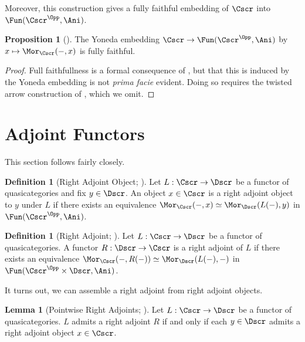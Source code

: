 \documentclass{amsart}
\theoremstyle{definition}
\newtheorem{lemma}[theorem]{Lemma}
\newtheorem{proposition}[theorem]{Proposition}
\newtheorem{definition}[theorem]{Definition}
\numberwithin{equation}{section}
\begin{document}
Moreover, this construction gives a fully faithful embedding of $\Cscr$ into $\Fun(\Cscr^{\Opp},\Ani)$.
\begin{proposition}[{\cite[Corr. 5.27]{Wagner}}]\label{prop: Yoneda is fully faithful}
  The Yoneda embedding $\Cscr\to\Fun(\Cscr^{\Opp},\Ani)$ by $x\mapsto\Mor_{\Cscr}(-,x)$ is fully faithful.
\end{proposition}
\begin{proof}
  Full faithfullness is a formal consequence of , but that this is induced by the Yoneda embedding is not \emph{prima facie} evident. Doing so requires the twisted arrow construction of \cite[\S 5.21]{Wagner}, which we omit.
\end{proof}
\section{Adjoint Functors}\label{sec: adjoint functors}
This section follows \cite[\S 6.1]{Wagner} fairly closely.
\begin{definition}[Right Adjoint Object; {\cite[Def. 6.1]{Wagner}}]\label{def: right adjoint object}
  Let $L:\Cscr\to\Dscr$ be a functor of quasicategories and fix $y\in\Dscr$. An object $x\in\Cscr$ is a right adjoint object to $y$ under $L$ if there exists an equivalence $\Mor_{\Cscr}(-,x)\simeq\Mor_{\Dscr}(L(-),y)$ in $\Fun(\Cscr^{\Opp},\Ani)$.
\end{definition}
\begin{definition}[Right Adjoint; {\cite[Def. 6.1]{Wagner}}]\label{def: right adjoint}
  Let $L:\Cscr\to\Dscr$ be a functor of quasicategories. A functor $R:\Dscr\to\Cscr$ is a right adjoint of $L$ if there exists an equivalence $\Mor_{\Cscr}(-,R(-))\simeq\Mor_{\Dscr}(L(-),-)$ in $\Fun(\Cscr^{\Opp}\times\Dscr,\Ani)$.
\end{definition}
It turns out, we can assemble a right adjoint from right adjoint objects.
\begin{lemma}[Pointwise Right Adjoints; {\cite[Lem. 6.2]{Wagner}}]\label{lem: pointwise adjunctions}
  Let $L:\Cscr\to\Dscr$ be a functor of quasicategories. $L$ admits a right adjoint $R$ if and only if each $y\in\Dscr$ admits a right adjoint object $x\in\Cscr$.
\end{lemma}
\end{document}
